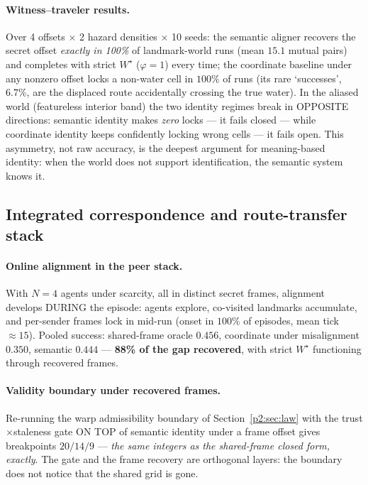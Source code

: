 \documentclass{article}
\newcommand{\wstar}{W^{\star}}
\begin{document}
\paragraph{Witness--traveler results.} Over 4 offsets $\times$ 2
hazard densities $\times$ 10 seeds: the semantic aligner recovers the
secret offset \emph{exactly in 100\%} of landmark-world runs
(mean $15.1$ mutual pairs) and completes with strict $\wstar$
($\varphi{=}1$) every time; the coordinate baseline under any nonzero
offset locks a non-water cell in $100\%$ of runs (its rare
`successes', $6.7\%$, are the displaced route accidentally crossing
the true water). In the aliased world (featureless interior band) the
two identity regimes break in OPPOSITE directions: semantic identity
makes \emph{zero} locks --- it fails closed --- while coordinate
identity keeps confidently locking wrong cells --- it fails open.
This asymmetry, not raw accuracy, is the deepest argument for
meaning-based identity: when the world does not support
identification, the semantic system knows it.

\subsection{Integrated correspondence and route-transfer stack}
\label{p3:sec:stack}

\paragraph{Online alignment in the peer stack.} With $N{=}4$ agents
under scarcity, all in distinct secret frames, alignment develops
DURING the episode: agents explore, co-visited landmarks accumulate,
and per-sender frames lock in mid-run (onset in $100\%$ of episodes,
mean tick ${\approx}15$). Pooled success: shared-frame oracle
$0.456$, coordinate under misalignment $0.350$, semantic $0.444$ ---
\textbf{88\% of the gap recovered}, with strict $\wstar$ functioning
through recovered frames.

\paragraph{Validity boundary under recovered frames.} Re-running the warp
admissibility boundary of Section~\ref{p2:sec:law} with the trust$\times$staleness gate ON TOP of semantic
identity under a frame offset gives breakpoints $20/14/9$ ---
\emph{the same integers as the shared-frame closed form, exactly}.
The gate and the frame recovery are orthogonal layers: the boundary does
not notice that the shared grid is gone.
\end{document}
